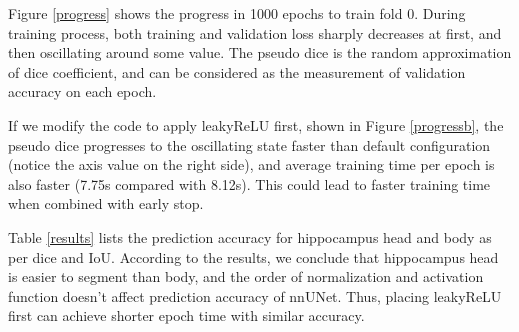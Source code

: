 \documentclass{article}
\begin{document}
Figure \ref{progress} shows the progress in 1000 epochs to train fold 0. During training process, both training and validation loss sharply decreases at first, and then oscillating around some value. The pseudo dice is the random approximation of dice coefficient, and can be considered as the measurement of validation accuracy on each epoch.

If we modify the code to apply leakyReLU first, shown in Figure \ref{progressb}, the pseudo dice progresses to the oscillating state faster than default configuration (notice the axis value on the right side), and average training time per epoch is also faster (7.75s compared with 8.12s). This could lead to faster training time when combined with early stop.

Table \ref{results} lists the prediction accuracy for hippocampus head and body as per dice and IoU. According to the results, we conclude that hippocampus head is easier to segment than body, and the order of normalization and activation function doesn't affect prediction accuracy of nnUNet. Thus, placing leakyReLU first can achieve shorter epoch time with similar accuracy.
\end{document}
